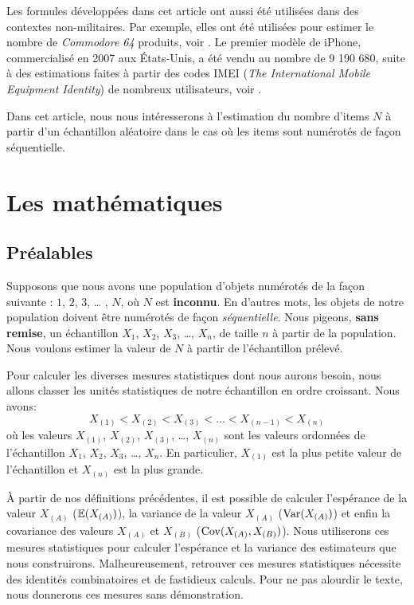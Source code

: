 \documentclass[10pt]{article}
\begin{document}
Les formules développées dans cet article ont aussi été utilisées dans
des contextes non-militaires. Par exemple, elles ont été utilisées pour
estimer le nombre de \emph{Commodore 64} produits, voir
\cite{commodore64}. Le premier modèle de iPhone, commercialisé en 2007
aux États-Unis, a été vendu au nombre de 9 190 680, suite à des
estimations faites à partir des codes IMEI (\emph{The International
Mobile Equipment Identity}) de nombreux utilisateurs, voir
\cite{iphone}.

Dans cet article, nous nous intéresserons à l'estimation du nombre
d'items \(N\) à partir d'un échantillon aléatoire dans le cas où les
items sont numérotés de façon séquentielle.

\hypertarget{les-mathematiques}{%
\section{\texorpdfstring{Les mathématiques
\label{maths}}{Les mathématiques }}\label{les-mathematiques}}

\hypertarget{prealables}{%
\subsection{Préalables}\label{prealables}}

Supposons que nous avons une population d'objets numérotés de la façon
suivante : \(1\), \(2\), \(3\), \ldots{} , \(N\), où \(N\) est
\textbf{inconnu}. En d'autres mots, les objets de notre population
doivent être numérotés de façon \emph{séquentielle}. Nous pigeons,
\textbf{sans remise}, un échantillon \(X_1\), \(X_2\), \(X_3\),
\ldots{}, \(X_n\), de taille \(n\) à partir de la population. Nous
voulons estimer la valeur de \(N\) à partir de l'échantillon prélevé.

Pour calculer les diverses mesures statistiques dont nous aurons besoin,
nous allons classer les unités statistiques de notre échantillon en
ordre croissant. Nous avons:
\[X_{(1)} <  X_{(2)} < X_{(3)} < \ldots < X_{(n-1)} < X_{(n)}\] où les
valeurs \(X_{(1)}\), \(X_{(2)}\), \(X_{(3)}\), \ldots{}, \(X_{(n)}\)
sont les valeurs ordonnées de l'échantillon \(X_1\), \(X_2\), \(X_3\),
\ldots{}, \(X_n\). En particulier, \(X_{(1)}\) est la plus petite valeur
de l'échantillon et \(X_{(n)}\) est la plus grande.

À partir de nos définitions précédentes, il est possible de calculer
l'espérance de la valeur \(X_{(A)}\) (\(\operatorname{\mathbb{E}} (X_{(A)})\)), la variance
de la valeur \(X_{(A)}\) (\(\operatorname{Var}(X_{(A)})\)) et enfin la covariance des
valeurs \(X_{(A)}\) et \(X_{(B)}\) (\(\operatorname{Cov}(X_{(A)},X_{(B)})\)). Nous
utiliserons ces mesures statistiques pour calculer l'espérance et la
variance des estimateurs que nous construirons. Malheureusement,
retrouver ces mesures statistiques nécessite des identités combinatoires
et de fastidieux calculs. Pour ne pas alourdir le texte, nous donnerons
ces mesures sans démonstration.
\end{document}
